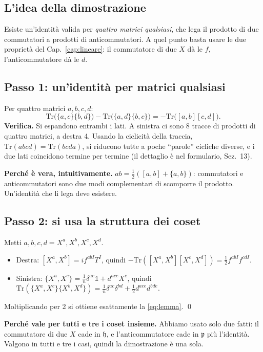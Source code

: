 \documentclass[11pt,a4paper]{article}
\numberwithin{equation}{section}
\theoremstyle{remark}
\newcommand{\Tr}{\mathrm{Tr}}
\newcommand{\p}{\mathfrak{p}}
\newcommand{\h}{\mathfrak{h}}
\newcommand{\one}{\mathbb{1}}
\begin{document}
\subsection{L'idea della dimostrazione}

Esiste un'identità valida per \emph{quattro matrici qualsiasi}, che lega il prodotto di due commutatori a prodotti di anticommutatori. A quel punto basta usare le due proprietà del Cap.~\ref{cap:lineare}: il commutatore di due $X$ dà le $f$, l'anticommutatore dà le $d$.

\subsection{Passo 1: un'identità per matrici qualsiasi}

Per quattro matrici $a,b,c,d$:
\begin{equation}
\Tr\big(\{a,c\}\{b,d\}\big)-\Tr\big(\{a,d\}\{b,c\}\big)=-\Tr\big([a,b][c,d]\big).
\label{eq:traceid}
\end{equation}
\textbf{Verifica.} Si espandono entrambi i lati. A sinistra ci sono 8 tracce di prodotti di quattro matrici, a destra 4. Usando la ciclicità della traccia, $\Tr(abcd)=\Tr(bcda)$, si riducono tutte a poche ``parole'' cicliche diverse, e i due lati coincidono termine per termine (il dettaglio è nel formulario, Sez.~13).

\textbf{Perché è vera, intuitivamente.} $ab=\frac12([a,b]+\{a,b\})$: commutatori e anticommutatori sono due modi complementari di scomporre il prodotto. Un'identità che li lega deve esistere.

\subsection{Passo 2: si usa la struttura dei coset}

Metti $a,b,c,d=X^a,X^b,X^c,X^d$.
\begin{itemize}
\item Destra: $[X^a,X^b]=if^{abI}T^I$, quindi $-\Tr([X^a,X^b][X^c,X^d])=\frac12f^{abI}f^{cdI}$.
\item Sinistra: $\{X^a,X^c\}=\frac1n\delta^{ac}\one+d^{ace}X^e$, quindi $\Tr(\{X^a,X^c\}\{X^b,X^d\})=\frac1n\delta^{ac}\delta^{bd}+\frac12d^{ace}d^{bde}$.
\end{itemize}
Moltiplicando per 2 si ottiene esattamente la \eqref{eq:lemma}. \qed

\textbf{Perché vale per tutti e tre i coset insieme.} Abbiamo usato solo due fatti: il commutatore di due $X$ cade in $\h$, e l'anticommutatore cade in $\p$ più l'identità. Valgono in tutti e tre i casi, quindi la dimostrazione è una sola.
\end{document}
